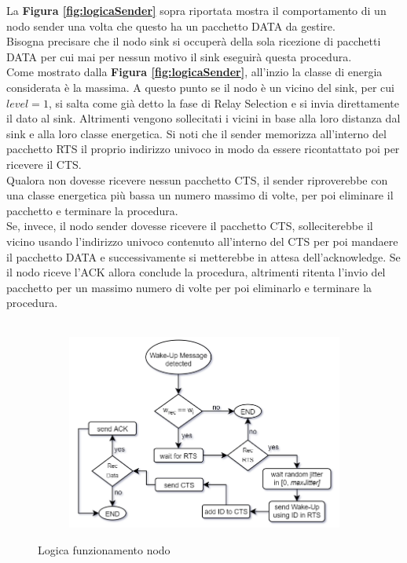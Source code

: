 La \textbf{Figura \ref{fig:logicaSender}} sopra riportata mostra il comportamento di un nodo sender una volta che questo ha un pacchetto DATA da gestire.\\

Bisogna precisare che il nodo sink si occuperà della sola ricezione di pacchetti DATA per cui mai per nessun motivo il sink eseguirà questa procedura.\\
Come mostrato dalla \textbf{Figura \ref{fig:logicaSender}}, all'inzio la classe di energia considerata è la massima. A questo punto se il nodo è un vicino del sink, per cui \(level=1\), si salta come già detto la fase di Relay Selection e si invia direttamente il dato al sink. Altrimenti vengono sollecitati i vicini in base alla loro distanza dal sink e alla loro classe energetica. Si noti che il sender memorizza all'interno del pacchetto RTS il proprio indirizzo univoco in modo da essere ricontattato poi per ricevere il CTS.\\
Qualora non dovesse ricevere nessun pacchetto CTS, il sender riproverebbe con una classe energetica più bassa un numero massimo di volte, per poi eliminare il pacchetto e terminare la procedura.\\
Se, invece, il nodo sender dovesse ricevere il pacchetto CTS, solleciterebbe il vicino usando l'indirizzo univoco contenuto all'interno del CTS per poi mandaere il pacchetto DATA e successivamente si metterebbe in attesa dell'acknowledge. Se il nodo riceve l'ACK allora conclude la procedura, altrimenti ritenta l'invio del pacchetto per un massimo numero di volte per poi eliminarlo e terminare la procedura.\\\\

\begin{figure}[h!]
  \begin{subfigure}[t]{.8\linewidth}
    \includegraphics[width=1.1\linewidth]{Contents/Images/schemes/greenWupBase/GreenWup_base_receiver.png}
  \end{subfigure}
  \caption{Logica funzionamento nodo }
  \label{fig:logicaReceiver}
\end{figure}

